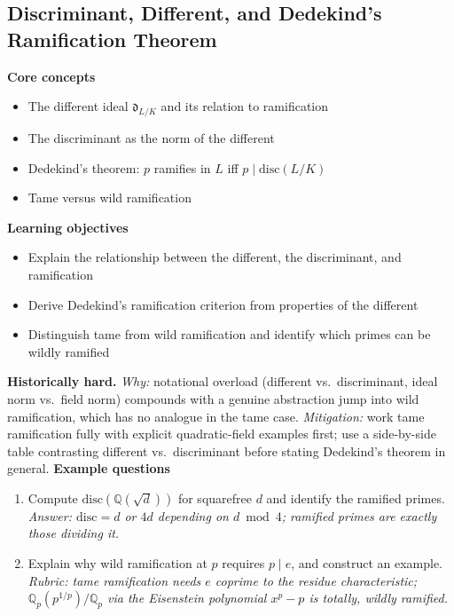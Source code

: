 \documentclass[11pt]{article}
\newcommand{\Q}{\mathbb{Q}}
\begin{document}
\subsection{Discriminant, Different, and Dedekind's Ramification Theorem}
\textbf{Core concepts}
\begin{itemize}[noitemsep]
  \item The different ideal $\mathfrak{d}_{L/K}$ and its relation to ramification
  \item The discriminant as the norm of the different
  \item Dedekind's theorem: $p$ ramifies in $L$ iff $p \mid \mathrm{disc}(L/K)$
  \item Tame versus wild ramification
\end{itemize}
\textbf{Learning objectives}
\begin{itemize}[noitemsep]
  \item Explain the relationship between the different, the discriminant, and ramification
  \item Derive Dedekind's ramification criterion from properties of the different
  \item Distinguish tame from wild ramification and identify which primes can be wildly ramified
\end{itemize}
\textbf{Historically hard.} \emph{Why:} notational overload (different vs.\ discriminant, ideal norm vs.\ field norm) compounds with a genuine abstraction jump into wild ramification, which has no analogue in the tame case. \emph{Mitigation:} work tame ramification fully with explicit quadratic-field examples first; use a side-by-side table contrasting different vs.\ discriminant before stating Dedekind's theorem in general.
\textbf{Example questions}
\begin{enumerate}[noitemsep]
  \item[Q1 (foundational).] Compute $\mathrm{disc}(\Q(\sqrt d))$ for squarefree $d$ and identify the ramified primes. \emph{Answer: $\mathrm{disc}=d$ or $4d$ depending on $d \bmod 4$; ramified primes are exactly those dividing it.}
  \item[Q2 (advanced).] Explain why wild ramification at $p$ requires $p \mid e$, and construct an example. \emph{Rubric: tame ramification needs $e$ coprime to the residue characteristic; $\Q_p(p^{1/p})/\Q_p$ via the Eisenstein polynomial $x^p-p$ is totally, wildly ramified.}
\end{enumerate}

\end{document}
